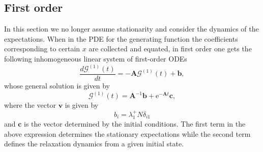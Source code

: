 \documentclass[a4paper, 11pt]{article}
\begin{document}
\subsection{First order}\label{subsec:o1_nonstat_problem}
In this section we no longer assume stationarity and consider the dynamics of the expectations. When in the PDE for the generating function the coefficients corresponding to certain $x$ are collected and equated, in first order one gets the following inhomogeneous linear system of first-order ODEs
\begin{equation}
\frac{d\boldsymbol{\mathcal G}^{(1)}(t)}{dt} = -\mathbf A \boldsymbol{\mathcal G}^{(1)}(t) + \mathbf b,
\end{equation}
whose general solution is given by
\begin{equation}\label{general_solution}
\boldsymbol{\mathcal G}^{(1)}(t) = \mathbf A^{-1}\mathbf b + \mathrm e^{-\mathbf A t}\mathbf c,
\end{equation}
where the vector $\mathbf v$ is given by
\begin{equation}\label{rhs_vector}
  b_i=\lambda^+_1N\delta_{i1}
\end{equation}
and $\mathbf c$ is the vector determined by the initial conditions. The first term in the above expression determines the stationary expectations while the second term defines the relaxation dynamics from a given initial state.
\end{document}
